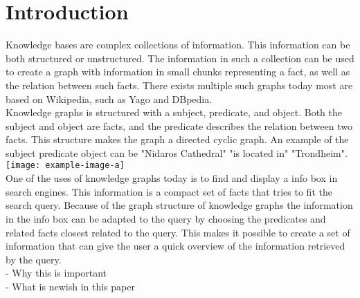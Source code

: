 
\chapter{Introduction}
Knowledge bases are complex collections of information. This information can be both structured or unstructured. The information in such a collection can be used to create a graph with information in small chunks representing a fact, as well as the relation between such facts. There exists multiple such graphs today most are based on Wikipedia, such as Yago\cite{yago} and DBpedia\cite{dbpedia}.\\
Knowledge graphs is structured with a subject, predicate, and object. Both the subject and object are facts, and the predicate describes the relation between two facts. This structure makes the graph a directed cyclic graph. An example of the subject predicate object can be "Nidaros Cathedral" "is located in" "Trondheim".\\
\texttt{[image: example-image-a]}\\
One of the uses of knowledge graphs today is to find and display a info box in search engines. This information is a compact set of facts that tries to fit the search query. Because of the graph structure of knowledge graphs the information in the info box can be adapted to the query by choosing the predicates and related facts closest related to the query. This makes it possible to create a set of information that can give the user a quick overview of the information retrieved by the query.\\

- Why this is important\\
- What is newish in this paper\\


